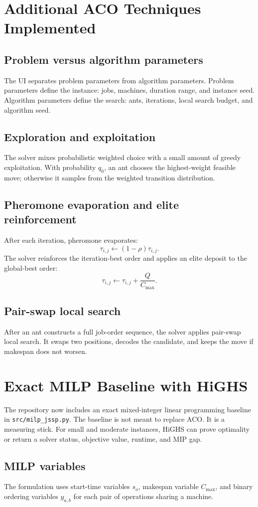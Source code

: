 \documentclass[11pt]{article}
\begin{document}
\section{Additional ACO Techniques Implemented}
\subsection{Problem versus algorithm parameters} The UI separates problem parameters from algorithm parameters. Problem parameters define the instance: jobs, machines, duration range, and instance seed. Algorithm parameters define the search: ants, iterations, local search budget, and algorithm seed.
\subsection{Exploration and exploitation} The solver mixes probabilistic weighted choice with a small amount of greedy exploitation. With probability $q_0$, an ant chooses the highest-weight feasible move; otherwise it samples from the weighted transition distribution.
\subsection{Pheromone evaporation and elite reinforcement} After each iteration, pheromone evaporates: \[\tau_{i,j}\leftarrow(1-\rho)\tau_{i,j}.\] The solver reinforces the iteration-best order and applies an elite deposit to the global-best order: \[\tau_{i,j}\leftarrow\tau_{i,j}+\frac{Q}{C_{\max}}.\]
\subsection{Pair-swap local search} After an ant constructs a full job-order sequence, the solver applies pair-swap local search. It swaps two positions, decodes the candidate, and keeps the move if makespan does not worsen.
\section{Exact MILP Baseline with HiGHS}
The repository now includes an exact mixed-integer linear programming baseline in \texttt{src/milp\_jssp.py}. The baseline is not meant to replace ACO. It is a measuring stick. For small and moderate instances, HiGHS can prove optimality or return a solver status, objective value, runtime, and MIP gap.
\subsection{MILP variables} The formulation uses start-time variables $s_o$, makespan variable $C_{\max}$, and binary ordering variables $y_{a,b}$ for each pair of operations sharing a machine.
\end{document}
